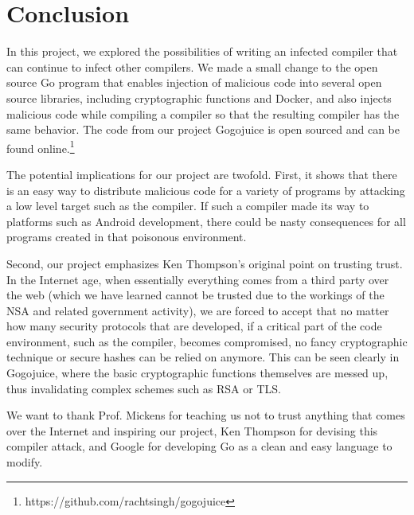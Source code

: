 \documentclass[10pt]{sigplanconf}
\begin{document}
\section{Conclusion}

In this project, we explored the possibilities of writing an infected compiler that can continue to infect other compilers. We made a small change to the open source Go program that enables injection of malicious code into several open source libraries, including cryptographic functions and Docker, and also injects malicious code while compiling a compiler so that the resulting compiler has the same behavior. The code from our project Gogojuice is open sourced and can be found online.\footnote{https://github.com/rachtsingh/gogojuice}

\smallskip

The potential implications for our project are twofold. First, it shows that there is an easy way to distribute malicious code for a variety of programs by attacking a low level target such as the compiler. If such a compiler made its way to platforms such as Android development, there could be nasty consequences for all programs created in that poisonous environment.

\smallskip
Second, our project emphasizes Ken Thompson's original point on trusting trust. In the Internet age, when essentially everything comes from a third party over the web (which we have learned cannot be trusted due to the workings of the NSA and related government activity), we are forced to accept that no matter how many security protocols that are developed, if a critical part of the code environment, such as the compiler, becomes compromised, no fancy cryptographic technique or secure hashes can be relied on anymore. This can be seen clearly in Gogojuice, where the basic cryptographic functions themselves are messed up, thus invalidating complex schemes such as RSA or TLS.

\acks

We want to thank Prof. Mickens for teaching us not to trust anything that comes over the Internet and inspiring our project, Ken Thompson for devising this compiler attack, and Google for developing Go as a clean and easy language to modify.




\end{document}
